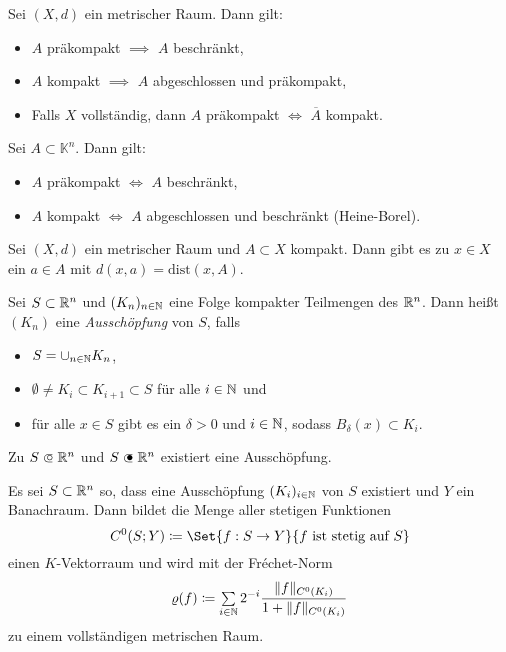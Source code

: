 \documentclass{cheat-sheet}
\newcommand{\K}{\mathbb{K}}
\newcommand{\dist}{\mathrm{dist}} %
\begin{document}
\begin{satz}
  Sei $(X, d)$ ein metrischer Raum. Dann gilt:
  \begin{itemize}
    \item $A$ präkompakt $\implies$ $A$ beschränkt,
    \item $A$ kompakt $\implies$ $A$ abgeschlossen und präkompakt,
    \item Falls $X$ vollständig, dann $A$ präkompakt $\iff$ $\overline{A}$ kompakt.
  \end{itemize}
\end{satz}

\begin{satz}
  Sei $A \subset \K^n$. Dann gilt:
  \begin{itemize}
    \item $A$ präkompakt $\iff$ $A$ beschränkt,
    \item $A$ kompakt $\iff$ $A$ abgeschlossen und beschränkt (Heine-Borel).
  \end{itemize}
\end{satz}

\begin{satz}
  Sei $(X, d)$ ein metrischer Raum und $A \subset X$ kompakt. Dann gibt es zu $x \in X$ ein $a \in A$ mit $d(x, a) = \dist(x, A)$.
\end{satz}

\begin{defn}
  Sei $S \subset \mathbb{R}^n$ und $(K_n)_{n \in \mathbb{N}}$ eine Folge kompakter Teilmengen des $\mathbb{R}^n$. Dann heißt $(K_n)$ eine \emph{Ausschöpfung} von $S$, falls
  \begin{itemize}
    \item $S = \cup_{n \in \mathbb{N}} K_n$,
    \item $\emptyset \not= K_i \subset K_{i+1} \subset S$ für alle $i \in \mathbb{N}$ und
    \item für alle $x \in S$ gibt es ein $\delta > 0$ und $i \in \mathbb{N}$, sodass $B_\delta(x) \subset K_i$.
  \end{itemize}
\end{defn}

\begin{bem}
  Zu $S \opn \R^n$ und $S \cls \R^n$ existiert eine Ausschöpfung.
\end{bem}

\begin{defn}
  Es sei $S \subset \mathbb{R}^n$ so, dass eine Ausschöpfung $(K_i)_{i \in \mathbb{N}}$ von $S$ existiert und $Y$ ein Banachraum. Dann bildet die Menge aller stetigen Funktionen
  \[ C^0(S; Y) \coloneqq \Set{ f : S \to Y }{ f \text{ ist stetig auf } S } \]
  einen $K$-Vektorraum und wird mit der Fréchet-Norm
  \[ \varrho(f) \coloneqq \sum_{i \in \N} 2^{-i} \frac{ \| f \|_{C^0(K_i)} }{ 1 + \| f \|_{C^0(K_i)} } \]
  zu einem vollständigen metrischen Raum.
\end{defn}
\end{document}
